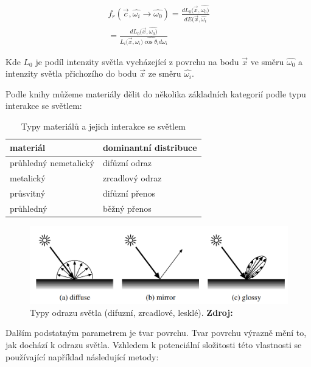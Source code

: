 \begin{equation} \label{eq:brdf}
	\begin{gathered}
		f_r(\vec{c}, \hat{\omega_i} \xrightarrow{} \hat{\omega_0}) = \frac{dL_0(\vec{x}, \hat{\omega_0)}}{dE(\vec{x}, \hat{\omega_i}} \\
		= \frac{dL_0(\vec{x}, \hat{\omega_0)}}{L_i(\vec{x}, \hat{\omega_i)\cos \theta_i d\omega_i}}
	\end{gathered}
\end{equation}

Kde $L_0$ je podíl intenzity světla vycházející z povrchu na bodu $\vec{x}$ ve směru $\hat{\omega_0}$ a intenzity světla přichozího do bodu $\vec{x}$ ze směru $\hat{\omega_i}$.

Podle knihy \cite{hunter_harold_1987} můžeme materiály dělit do několika základních kategorií podle typu interakce se světlem:

\begin{table}[H]
	\centering
	\begin{tabular}{|l|l|}
		\hline
		materiál              & dominantní distribuce \\ \hline
		průhledný nemetalický & difůzní odraz         \\ \hline
		metalický             & zrcadlový odraz       \\ \hline
		průsvitný             & difůzní přenos        \\ \hline
		průhledný             & běžný přenos          \\ \hline
	\end{tabular}
	\caption{Typy materiálů a jejich interakce se světlem}
\end{table}

\begin{figure}[H]
	\centering
	\includegraphics[scale=1]{obrazky-figures/reflection_types.png}
	\caption{Typy odrazu světla (difuzní, zrcadlové, lesklé). \textbf{Zdroj: \cite{materials}}}
	\label{fig:3d_grid}
\end{figure}

Dalším podstatným parametrem je tvar povrchu. Tvar povrchu výrazně mění to, jak dochází k odrazu světla. Vzhledem k potenciální složitosti této vlastnosti se používající například následující metody:

